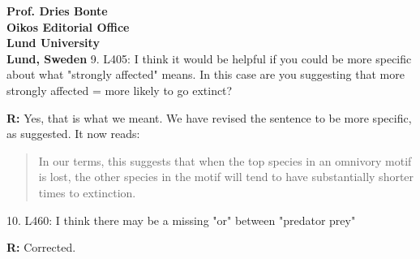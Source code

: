 \documentclass[12pt]{letter}
\begin{document}
\begin{letter}{\bf Prof. Dries Bonte\\
Oikos Editorial Office \\
Lund University \\
Lund, Sweden}
    9. L405: I think it would be helpful if you could be more specific about what "strongly affected" means. In this case are you suggesting that more strongly affected = more likely to go extinct?


    \smallskip

    \textbf{R:} Yes, that is what we meant. We have revised the sentence to be more specific, as suggested. It now reads:
  
      \begin{quotation}
      In our terms, this suggests that when the top species in an omnivory motif is lost, the other species in the motif will tend to have substantially shorter times to extinction.
      \end{quotation}

    \smallskip

    10. L460: I think there may be a missing "or" between "predator prey"

    \smallskip

    \textbf{R:} Corrected.

    \smallskip

\clearpage

\end{letter}

\clearpage
    
 
\end{document}
